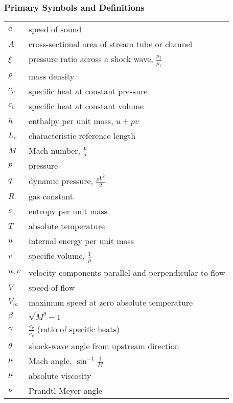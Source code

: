 \subsubsection{Primary Symbols and Definitions}

\begin{flushleft}
\renewcommand{\arraystretch}{1.3} %
\begin{tabular}{ll}
$a$ & speed of sound \\
$A$ & cross-sectional area of stream tube or channel \\
$\xi$ & pressure ratio across a shock wave, $ \frac{p_2}{p_1} $ \\
$\rho$ & mass density \\
$c_p$ & specific heat at constant pressure \\
$c_v$ & specific heat at constant volume \\
$h$ & enthalpy per unit mass, $ u + pv $ \\
$L_c$ & characteristic reference length \\
$M$ & Mach number, $ \frac{V}{a} $ \\
$p$ & pressure \\
$q$ & dynamic pressure, $ \frac{\rho V^2}{2} $ \\
$R$ & gas constant \\
$s$ & entropy per unit mass \\
$T$ & absolute temperature \\
$u$ & internal energy per unit mass \\
$v$ & specific volume, $ \frac{1}{\rho} $ \\
$u,v$ & velocity components parallel and perpendicular to flow \\
$V$ & speed of flow \\
$V_\infty$ & maximum speed at zero absolute temperature \\
$\beta$ & $ \sqrt{M^2 - 1} $ \\
$\gamma$ & $ \frac{c_p}{c_v} $ (ratio of specific heats) \\
$\theta$ & shock-wave angle from upstream direction \\
$\mu$ & Mach angle, $ \sin^{-1} \frac{1}{M} $ \\
$\mu$ & absolute viscosity \\
$\nu$ & Prandtl-Meyer angle \\
\end{tabular}
\end{flushleft}

